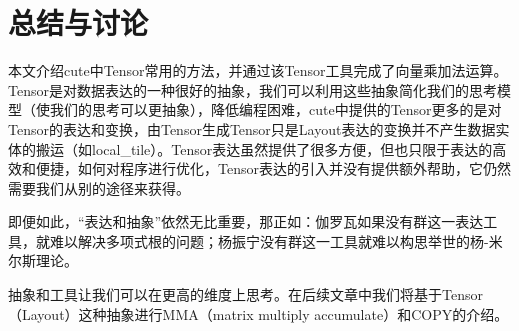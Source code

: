 \section{总结与讨论}

本文介绍cute中Tensor常用的方法，并通过该Tensor工具完成了向量乘加法运算。Tensor是对数据表达的一种很好的抽象，我们可以利用这些抽象简化我们的思考模型（使我们的思考可以更抽象），降低编程困难，cute中提供的Tensor更多的是对Tensor的表达和变换，由Tensor生成Tensor只是Layout表达的变换并不产生数据实体的搬运（如local\_tile）。Tensor表达虽然提供了很多方便，但也只限于表达的高效和便捷，如何对程序进行优化，Tensor表达的引入并没有提供额外帮助，它仍然需要我们从别的途径来获得。

即便如此，“表达和抽象”依然无比重要，那正如：伽罗瓦如果没有群这一表达工具，就难以解决多项式根的问题；杨振宁没有群这一工具就难以构思举世的杨-米尔斯理论。

抽象和工具让我们可以在更高的维度上思考。在后续文章中我们将基于Tensor（Layout）这种抽象进行MMA（matrix multiply accumulate）和COPY的介绍。
